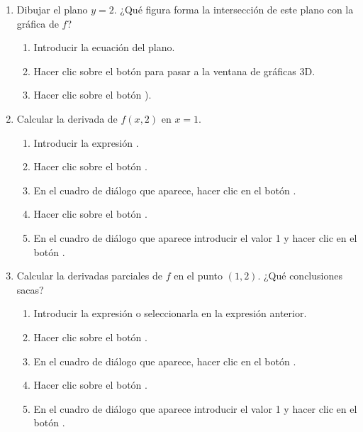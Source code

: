 \begin{enumerate}[leftmargin=*]
\begin{enumerate}
\item Dibujar el plano $y=2$. ¿Qué figura forma la intersección de este plano con la gráfica de $f$?
\begin{indication}
\begin{enumerate}
\item Introducir la ecuación del plano.
\item Hacer clic sobre el botón  para pasar a la ventana de gráficas 3D.
\item Hacer clic sobre el botón ).
\end{enumerate}
\end{indication}

\item Calcular la derivada de $f(x,2)$ en $x=1$.
\begin{indication}
\begin{enumerate}
\item Introducir la expresión .
\item Hacer clic sobre el botón .
\item En el cuadro de diálogo que aparece, hacer clic en el botón .
\item Hacer clic sobre el botón .
\item En el cuadro de diálogo que aparece introducir el valor 1 y hacer clic en el botón .
\end{enumerate}
\end{indication}

\item Calcular la derivadas parciales de $f$ en el punto $(1,2)$. ¿Qué conclusiones sacas?
\begin{indication}
\begin{enumerate}
\item Introducir la expresión  o seleccionarla en la expresión anterior. 
\item Hacer clic sobre el botón .
\item En el cuadro de diálogo que aparece, hacer clic en el botón .
\item Hacer clic sobre el botón .
\item En el cuadro de diálogo que aparece introducir el valor 1 y hacer clic en el botón .
\end{enumerate}
\end{indication}
\end{enumerate}



\end{enumerate}
